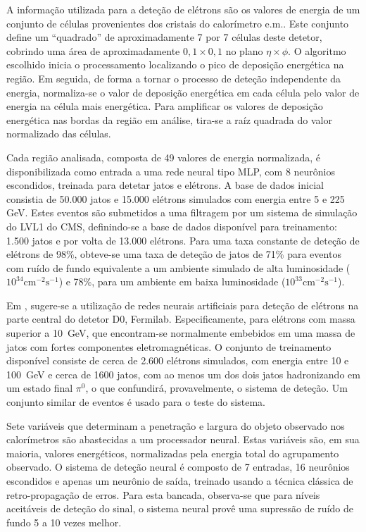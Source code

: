 A informação utilizada para a deteção de elétrons são os valores de energia de
um conjunto de células provenientes dos cristais do calorímetro e.m.. Este
conjunto define um ``quadrado'' de aproximadamente 7 por 7 células deste
detetor, cobrindo uma área de aproximadamente $0,1 \times 0,1$ no plano $\eta
\times \phi$. O algoritmo escolhido inicia o processamento localizando o pico
de deposição energética na região. Em seguida, de forma a tornar o processo de
deteção independente da energia, normaliza-se o valor de deposição energética
em cada célula pelo valor de energia na célula mais energética. Para
amplificar os valores de deposição energética nas bordas da região em análise,
tira-se a raíz quadrada do valor normalizado das células.

Cada região analisada, composta de 49 valores de energia normalizada, é
disponibilizada como entrada a uma rede neural tipo MLP, com 8 neurônios
escondidos, treinada para detetar jatos e elétrons. A base de dados inicial
consistia de 50.000 jatos e 15.000 elétrons simulados com energia entre 5 e
225 GeV. Estes eventos são submetidos a uma filtragem por um sistema de
simulação do LVL1 do CMS, definindo-se a base de dados disponível para
treinamento: 1.500 jatos e por volta de 13.000 elétrons. Para uma taxa
constante de deteção de elétrons de 98\%, obteve-se uma taxa de deteção de
jatos de 71\% para eventos com ruído de fundo equivalente a um ambiente
simulado de alta luminosidade ($10^{34}\text{cm}^{-2}\text{s}^{-1}$) e 78\%,
para um ambiente em baixa luminosidade ($10^{33}\text{cm}^{-2}\text{s}^{-1}$).

Em \cite{chakraborty-acat-2001}, sugere-se a utilização de redes neurais
artificiais para deteção de elétrons na parte central do detetor D0,
Fermilab. Especificamente, para elétrons com massa superior a 10~GeV, que
encontram-se normalmente embebidos em uma massa de jatos com fortes
componentes eletromagnéticas. O conjunto de treinamento disponível consiste de
cerca de 2.600 elétrons simulados, com energia entre 10 e 100~GeV e cerca de
1600 jatos, com ao menos um dos dois jatos hadronizando em um estado final
$\pi^0$, o que confundirá, provavelmente, o sistema de deteção. Um conjunto
similar de eventos é usado para o teste do sistema.

Sete variáveis que determinam a penetração e largura do objeto observado nos
calorímetros são abastecidas a um processador neural. Estas variáveis são, em
sua maioria, valores energéticos, normalizadas pela energia total do
agrupamento observado. O sistema de deteção neural é composto de 7 entradas,
16 neurônios escondidos e apenas um neurônio de saída, treinado usando a
técnica clássica de retro-propagação de erros. Para esta bancada, observa-se
que para níveis aceitáveis de deteção do sinal, o sistema neural provê uma
supressão de ruído de fundo 5 a 10 vezes melhor.

